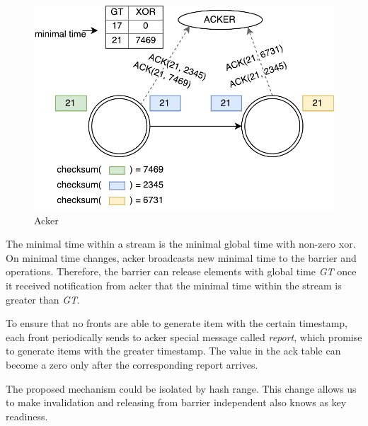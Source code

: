 \begin{figure}[htbp]
  \centering
  \includegraphics[scale=0.5]{pics/acker}
  \caption{Acker}
  \label {acker}
\end{figure}

The minimal time within a stream is the minimal global time with non-zero xor. On minimal time changes, acker broadcasts new minimal time to the barrier and operations. Therefore, the barrier can release elements with global time {\it GT} once it received notification from acker that the minimal time within the stream is greater than {\it GT}.

To ensure that no fronts are able to generate item with the certain timestamp, each front periodically sends to acker special message called {\it report}, which promise to generate items with the greater timestamp. The value in the ack table can become a zero only after the corresponding report arrives.

The proposed mechanism could be isolated by hash range. This change allows us to make invalidation and releasing from barrier independent also knows as key readiness.
